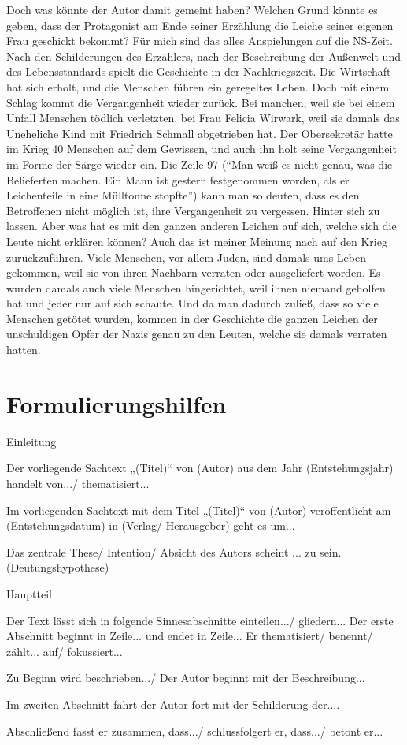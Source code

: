 Doch was könnte der Autor damit gemeint haben? Welchen Grund könnte es geben, dass der Protagonist am Ende seiner Erzählung die Leiche seiner eigenen Frau geschickt bekommt? Für mich sind das alles Anspielungen auf die NS-Zeit. Nach den Schilderungen des Erzählers, nach der Beschreibung der Außenwelt und des Lebensstandards spielt die Geschichte in der Nachkriegszeit. Die Wirtschaft hat sich erholt, und die Menschen führen ein geregeltes Leben. Doch mit einem Schlag kommt die Vergangenheit wieder zurück. Bei manchen, weil sie bei einem Unfall Menschen tödlich verletzten, bei Frau Felicia Wirwark, weil sie damals das Uneheliche Kind mit Friedrich Schmall abgetrieben hat. Der Obersekretär hatte im Krieg 40 Menschen auf dem Gewissen, und auch ihn holt seine Vergangenheit im Forme der Särge wieder ein. Die Zeile 97 (“Man weiß es nicht genau, was die Belieferten machen. Ein Mann ist gestern festgenommen worden, als er Leichenteile in eine Mülltonne stopfte”) kann man so deuten, dass es den Betroffenen nicht möglich ist, ihre Vergangenheit zu vergessen. Hinter sich zu lassen. Aber was hat es mit den ganzen anderen Leichen auf sich, welche sich die Leute nicht erklären können? Auch das ist meiner Meinung nach auf den Krieg zurückzuführen. 
Viele Menschen, vor allem Juden, sind damals ums Leben gekommen, weil sie von ihren Nachbarn verraten oder ausgeliefert worden. Es wurden damals auch viele Menschen hingerichtet, weil ihnen niemand geholfen hat und jeder nur auf sich schaute. Und da man dadurch zuließ, dass so viele Menschen getötet wurden, kommen in der Geschichte die ganzen Leichen der unschuldigen Opfer der Nazis genau zu den Leuten, welche sie damals verraten hatten.	 
\newpage


\section{Formulierungshilfen}   
Einleitung
\begin{compactitem}
    \item Der vorliegende Sachtext „(Titel)“ von (Autor) aus dem Jahr (Entstehungsjahr) handelt von.../ thematisiert... 
    \item Im vorliegenden Sachtext mit dem Titel „(Titel)“ von (Autor) veröffentlicht am (Entstehungsdatum) in (Verlag/ Herausgeber) geht es um... 
    \item Das zentrale These/ Intention/ Absicht des Autors scheint ... zu sein. (Deutungshypothese) 
\end{compactitem}
Hauptteil
\begin{compactitem}
    \item Der Text lässt sich in folgende Sinnesabschnitte einteilen.../ gliedern... Der erste Abschnitt beginnt in Zeile... und endet in Zeile... Er thematisiert/ benennt/ zählt... auf/ fokussiert... 
    \item Zu Beginn wird beschrieben.../ Der Autor beginnt mit der Beschreibung... 
    \item Im zweiten Abschnitt fährt der Autor fort mit der Schilderung der.... 
    \item Abschließend fasst er zusammen, dass.../ schlussfolgert er, dass.../ betont er... 
\end{compactitem}

